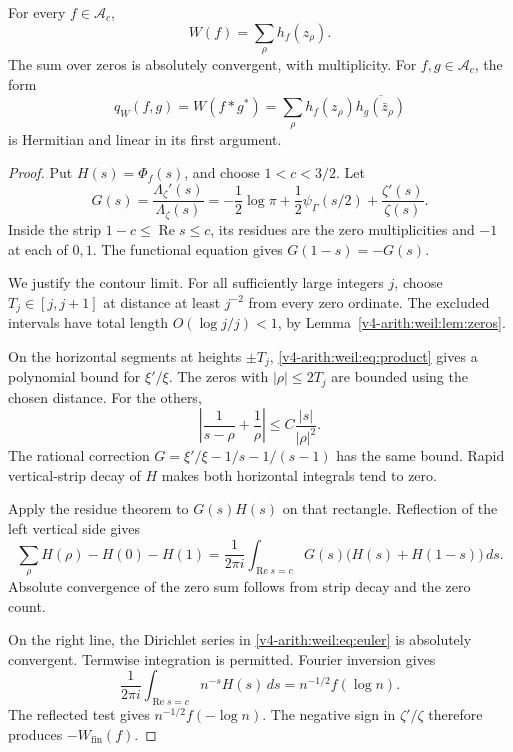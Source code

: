 \begin{theorem}
\label{v4-arith:weil:thm:explicit}
For every \(f\in\mathscr A_c\),
\begin{equation}
 W(f)=\sum_\rho h_f(z_\rho).
 \label{v4-arith:weil:eq:explicit}
\end{equation}
The sum over zeros is absolutely convergent, with multiplicity.
For \(f,g\in\mathscr A_c\), the form
\begin{equation}
 q_W(f,g)=W(f*g^*)
       =\sum_\rho h_f(z_\rho)\overline{h_g(\bar z_\rho)}
 \label{v4-arith:weil:eq:pairing}
\end{equation}
is Hermitian and linear in its first argument.
\end{theorem}
\begin{proof}
Put \(H(s)=\Phi_f(s)\), and choose \(1<c<3/2\).
Let
\[
 G(s)=\frac{\Lambda_\zeta'(s)}{\Lambda_\zeta(s)}
      =-\frac12\log\pi+\frac12\psi_\Gamma(s/2)
                         +\frac{\zeta'(s)}{\zeta(s)}.
\]
Inside the strip \(1-c\le\operatorname{Re}s\le c\), its residues
are the zero multiplicities and \(-1\) at each of \(0,1\).
The functional equation gives \(G(1-s)=-G(s)\).

We justify the contour limit. For all sufficiently large integers \(j\),
choose \(T_j\in[j,j+1]\) at distance at least \(j^{-2}\) from every zero
ordinate. The excluded intervals have total length
\(O(\log j/j)<1\), by Lemma~\ref{v4-arith:weil:lem:zeros}.

On the horizontal segments at heights \(\pm T_j\),
\eqref{v4-arith:weil:eq:product} gives a polynomial bound for
\(\xi'/\xi\). The zeros with \(|\rho|\le2T_j\) are bounded using the
chosen distance. For the others,
\[
 \left|\frac1{s-\rho}+\frac1\rho\right|
       \le C\frac{|s|}{|\rho|^2}.
\]
The rational correction
\(G=\xi'/\xi-1/s-1/(s-1)\) has the same bound.
Rapid vertical-strip decay of \(H\) makes both horizontal integrals
tend to zero.

Apply the residue theorem to \(G(s)H(s)\) on that rectangle.
Reflection of the left vertical side gives
\begin{equation}
 \sum_\rho H(\rho)-H(0)-H(1)
 =\frac1{2\pi i}\int_{\operatorname{Re}s=c}
             G(s)\bigl(H(s)+H(1-s)\bigr)\,ds.
 \label{v4-arith:weil:eq:contour}
\end{equation}
Absolute convergence of the zero sum follows from strip decay and
the zero count.

On the right line, the Dirichlet series in
\eqref{v4-arith:weil:eq:euler} is absolutely convergent.
Termwise integration is permitted. Fourier inversion gives
\[
 \frac1{2\pi i}\int_{\operatorname{Re}s=c}
                 n^{-s}H(s)\,ds=n^{-1/2}f(\log n).
\]
The reflected test gives \(n^{-1/2}f(-\log n)\).
The negative sign in \(\zeta'/\zeta\) therefore produces
\(-W_{\mathrm{fin}}(f)\).


\end{proof}
